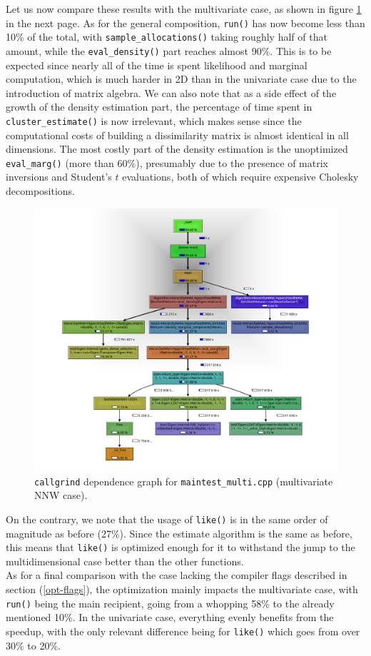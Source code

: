 Let us now compare these results with the multivariate case, as shown in figure \ref{fig:profiling_nnw} in the next page.
As for the general composition, \verb|run()| has now become less than 10\% of the total, with \verb|sample_allocations()| taking roughly half of that amount, while the \verb|eval_density()| part reaches almost 90\%.
This is to be expected since nearly all of the time is spent likelihood and marginal computation, which is much harder in 2D than in the univariate case due to the introduction of matrix algebra.
We can also note that as a side effect of the growth of the density estimation part, the percentage of time spent in \verb|cluster_estimate()| is now irrelevant, which makes sense since the computational costs of building a dissimilarity matrix is almost identical in all dimensions.
The most costly part of the density estimation is the unoptimized \verb|eval_marg()| (more than 60\%), presumably due to the presence of matrix inversions and Student's $t$ evaluations, both of which require expensive Cholesky decompositions.
\begin{figure}[h]
	\hspace{-60pt}
	\includegraphics[scale=0.45]{etc/kcg_multi.png}
	\caption{\texttt{callgrind} dependence graph for \texttt{maintest\_multi.cpp} (multivariate NNW case).}
	\label{fig:profiling_nnw}
\end{figure}
On the contrary, we note that the usage of \verb|like()| is in the same order of magnitude as before (27\%).
Since the estimate algorithm is the same as before, this means that \verb|like()| is optimized enough for it to withstand the jump to the multidimensional case better than the other functions. \\
As for a final comparison with the case lacking the compiler flags described in section (\ref{opt-flags}), the optimization mainly impacts the multivariate case, with \verb|run()| being the main recipient, going from a whopping 58\% to the already mentioned 10\%.
In the univariate case, everything evenly benefits from the speedup, with the only relevant difference being for \verb|like()| which goes from over 30\% to 20\%.



